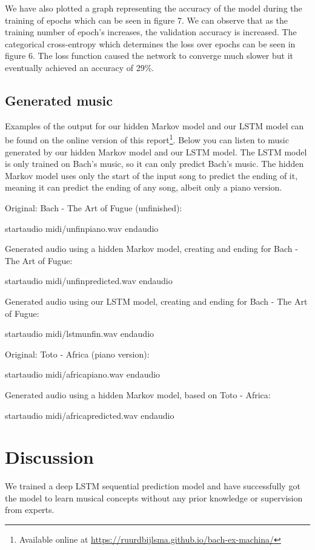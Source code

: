 \documentclass[11pt, twocolumn]{article}
\begin{document}
We have also plotted a graph representing the accuracy of the model during the training of epochs which can be seen in figure 7. We can observe that as the training number of epoch’s increases, the validation accuracy is increased. The categorical cross-entropy which determines the loss over epochs can be seen in figure 6. The loss function caused the network to converge much slower but it eventually achieved an accuracy of 29\%.   



\subsection{Generated music}
\ifpdf
Examples of the output for our hidden Markov model and our LSTM model can be found on the online version of this report\footnote{Available online at \url{https://ruurdbijlsma.github.io/bach-ex-machina/}}.
\else
Below you can listen to music generated by our hidden Markov model and our LSTM model. The LSTM model is only trained on Bach's music, so it can only predict Bach's music. The hidden Markov model uses only the start of the input song to predict the ending of it, meaning it can predict the ending of any song, albeit only a piano version.

Original: Bach - The Art of Fugue (unfinished):

startaudio midi/unfinpiano.wav endaudio

Generated audio using a hidden Markov model, creating and ending for Bach - The Art of Fugue:

startaudio midi/unfinpredicted.wav endaudio

Generated audio using our LSTM model, creating and ending for Bach - The Art of Fugue:

startaudio midi/lstmunfin.wav endaudio

Original: Toto - Africa (piano version):

startaudio midi/africapiano.wav endaudio

Generated audio using a hidden Markov model, based on Toto - Africa:

startaudio midi/africapredicted.wav endaudio

\fi

\section{Discussion}
 We trained a deep LSTM sequential prediction model and have successfully got the model to learn musical concepts without any prior knowledge or supervision from experts.
\end{document}
